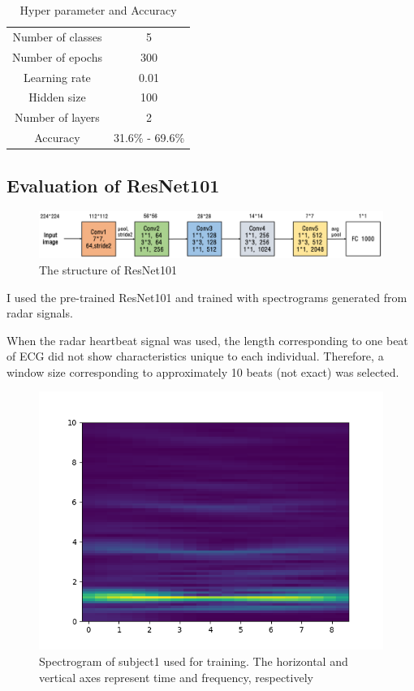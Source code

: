 \documentclass[dvipdfmx]{article}
\begin{document}
\begin{table}[H]
\caption{Hyper parameter and Accuracy}
\centering
\begin{tabular}{cc}
\hline
Number of classes & 5 \\
Number of epochs & 300 \\
Learning rate & 0.01\\
Hidden size & 100 \\
Number of layers & 2 \\
Accuracy & 31.6\% - 69.6\% \\
\hline
\end{tabular}
\end{table}

\subsection{Evaluation of ResNet101}

\begin{figure}[H]
\begin{center}
\includegraphics[width=\linewidth]{./img/ResNet101.png}
\end{center}
\caption{The structure of ResNet101}
\end{figure}

I used the pre-trained ResNet101 and trained with spectrograms generated from radar signals.

When the radar heartbeat signal was used, the length corresponding to one beat of ECG did not show characteristics unique to each individual. Therefore, a window size corresponding to approximately 10 beats (not exact) was selected.

\begin{figure}[H]
\begin{center}
\includegraphics[width=\linewidth]{./img/stft_01_010.png}
\end{center}
\caption{Spectrogram of subject1 used for training. The horizontal and vertical axes represent time and frequency, respectively}
\end{figure}
\end{document}
